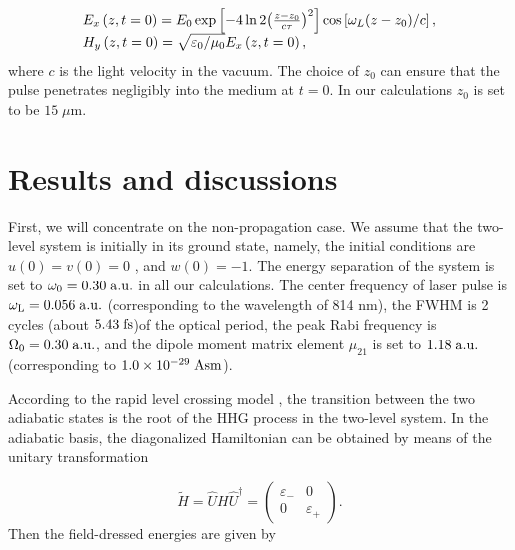 \documentclass[10pt,letterpaper]{article}
\begin{document}
\begin{equation}
\begin{array}{l}
{E_x}\left( {z,t = 0} \right) = {E_0}\exp \left[ { - 4\ln 2{{\left( {\frac{{z - {z_0}}}{{c\tau }}} \right)}^2}} \right]\cos \left[ {{\omega _L}{{\left( {z - {z_0}} \right)} \mathord{\left/
			{\vphantom {{\left( {z - {z_0}} \right)} c}} \right.
			\kern-\nulldelimiterspace} c}} \right],\\
{H_y}\left( {z,t = 0} \right) = \sqrt {{{{\varepsilon _0}} \mathord{\left/
			{\vphantom {{{\varepsilon _0}} {{\mu _0}}}} \right.
			\kern-\nulldelimiterspace} {{\mu _0}}}} {E_x}\left( {z,t = 0} \right),
\end{array}
\label{eq13}
\end{equation}
where $ c $ is the light velocity in the vacuum. The choice of $ z_{0} $ can ensure that the pulse penetrates negligibly into the medium at $ t=0 $. In our calculations $ z_{0} $ is set to be $15\;\mu$m.

\section{Results and discussions}
First, we will concentrate on the non-propagation case. We assume that the two-level system is initially in its ground state, namely, the initial conditions are $ u(0)=v(0)=0 $ , and $ w(0)=-1 $. The energy separation of the system is set to $ \omega_{0}=0.30\;\rm{a.u.}$  in all our calculations. The center frequency of laser pulse is $ \omega_{\rm{L}}=0.056\;\rm{a.u.}$ (corresponding to the wavelength of 814 nm), the FWHM is 2 cycles (about $ 5.43\;\rm{fs} $)of the optical period, the peak Rabi frequency is $ \Omega_{0}=0.30\;\rm{a.u.} $, and the dipole moment matrix element $ \mu_{21} $  is set to $1.18\;\rm{a.u.}$ (corresponding to  $ 1.0\times10^{-29}\;\rm{Asm} $).

According to the rapid level crossing model \cite{Gauthey-Early-Two-Level-PRA-1997}, the transition between the two adiabatic states is the root of the HHG process in the two-level system. In the adiabatic basis, the diagonalized Hamiltonian can be obtained by means of the unitary transformation

\begin{equation}
\tilde H = \hat UH{\hat U^\dag } = \left( {\begin{array}{*{20}{c}}
	{{\varepsilon _ - }}&0\\
	0&{{\varepsilon _ + }}
	\end{array}} \right).
\label{eq14}
\end{equation}
Then the field-dressed energies are given by \cite{YangWeifeng-Two-Level-PLA-2007}
\end{document}
